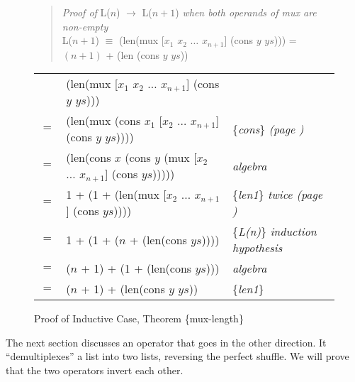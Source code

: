 \begin{figure}
\begin{quote}
\emph{Proof of} L($n$) $\rightarrow$ L($n+1$) \emph{when both operands of mux are non-empty}\\
L($n+1$) $\equiv$ (len(mux [$x_1$ $x_2$ $\dots$ $x_{n+1}$] (cons $y$ $ys$))) = $(n+1)$ + (len (cons $y$ $ys$))
\end{quote}
\begin{center}
\begin{tabular}{lll}
    & (len(mux [$x_1$ $x_2$ $\dots$ $x_{n+1}$] (cons $y$ $ys$)))             &   \\
$=$ & (len(mux (cons $x_1$ [$x_2$ $\dots$ $x_{n+1}$] (cons $y$ $ys$))))      & \{\emph{cons}\} \emph{(page \pageref{first-rest-cons})} \\
$=$ & (len(cons $x$ (cons $y$ (mux [$x_2$ $\dots$ $x_{n+1}$] (cons $ys$))))) & \emph{algebra} \\
$=$ & 1 + (1 + (len(mux [$x_2$ $\dots$ $x_{n+1}$] (cons $ys$))))             & \{\emph{len1}\} \emph{twice (page \pageref{len-equations})} \\
$=$ & 1 + (1 + ($n$ + (len(cons $ys$))))                                     & \{\emph{L(n)}\} \emph{induction hypothesis} \\
$=$ & ($n$ + 1) + (1 + (len(cons $ys$)))                                     & \emph{algebra} \\
$=$ & ($n$ + 1) + (len(cons $y$ $ys$))                                       & \{\emph{len1}\} \\
\end{tabular}
\end{center}
\caption{Proof of Inductive Case, Theorem \{mux-length\}}
\label{fig:prf-mux-len-induc}
\end{figure}

The next section discusses an operator that goes in the other direction.
It ``demultiplexes'' a list into two lists, reversing the perfect shuffle.
We will prove that the two operators invert each other.

